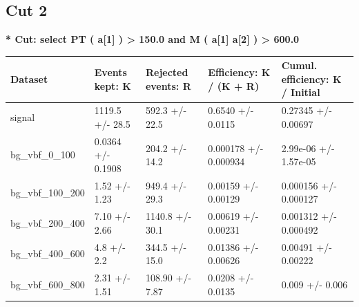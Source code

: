 \documentclass[a4paper, 10pt]{article}
\begin{document}
   \newpage
\subsection{Cut 2}

\textbf{* Cut: select PT ( a[1] ) > 150.0 and M ( a[1] a[2] ) > 600.0}\\
   \begin{table}[H]
  \begin{center}
    \begin{tabular}{|m{20.0mm}|m{27.0mm}|m{27.0mm}|m{33.0mm}|m{32.0mm}|}
      \hline
      {\cellcolor{yellow}         Dataset}& {\cellcolor{yellow}         Events kept:
          K}& {\cellcolor{yellow}         Rejected events:
          R}& {\cellcolor{yellow}         Efficiency:
          K /\- (K + R)}& {\cellcolor{yellow}         Cumul. efficiency:
          K /\- Initial}\\
      \hline
      {\cellcolor{white}         signal}& {\cellcolor{white}         1119.5 +/\-- 28.5}& {\cellcolor{white}         592.3 +/\-- 22.5}& {\cellcolor{white}         0.6540 +/\-- 0.0115}& {\cellcolor{white}         0.27345 +/\-- 0.00697}\\
      \hline
      {\cellcolor{white}         bg\_vbf\_0\_100}& {\cellcolor{white}         0.0364 +/\-- 0.1908}& {\cellcolor{white}         204.2 +/\-- 14.2}& {\cellcolor{white}         0.000178 +/\-- 0.000934}& {\cellcolor{white}         2.99e-06 +/\-- 1.57e-05}\\
      \hline
      {\cellcolor{white}         bg\_vbf\_100\_200}& {\cellcolor{white}         1.52 +/\-- 1.23}& {\cellcolor{white}         949.4 +/\-- 29.3}& {\cellcolor{white}         0.00159 +/\-- 0.00129}& {\cellcolor{white}         0.000156 +/\-- 0.000127}\\
      \hline
      {\cellcolor{white}         bg\_vbf\_200\_400}& {\cellcolor{white}         7.10 +/\-- 2.66}& {\cellcolor{white}         1140.8 +/\-- 30.1}& {\cellcolor{white}         0.00619 +/\-- 0.00231}& {\cellcolor{white}         0.001312 +/\-- 0.000492}\\
      \hline
      {\cellcolor{white}         bg\_vbf\_400\_600}& {\cellcolor{white}         4.8 +/\-- 2.2}& {\cellcolor{white}         344.5 +/\-- 15.0}& {\cellcolor{white}         0.01386 +/\-- 0.00626}& {\cellcolor{white}         0.00491 +/\-- 0.00222}\\
      \hline
      {\cellcolor{white}         bg\_vbf\_600\_800}& {\cellcolor{white}         2.31 +/\-- 1.51}& {\cellcolor{white}         108.90 +/\-- 7.87}& {\cellcolor{white}         0.0208 +/\-- 0.0135}& {\cellcolor{white}         0.009 +/\-- 0.006}\\

\end{tabular}
\end{center}
\end{table}
\end{document}
